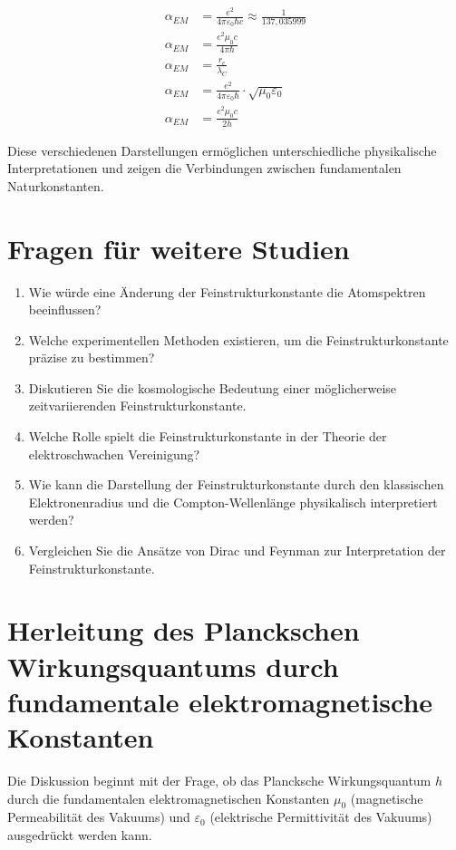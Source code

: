 \documentclass[12pt,a4paper]{article}
\begin{document}
	\begin{align}
		\alpha_{EM} &= \frac{e^2}{4\pi\varepsilon_0\hbar c} \approx \frac{1}{137,035999}\\
		\alpha_{EM} &= \frac{e^2\mu_0 c}{4\pi\hbar}\\
		\alpha_{EM} &= \frac{r_e}{\lambda_C}\\
		\alpha_{EM} &= \frac{e^2}{4\pi\varepsilon_0\hbar} \cdot \sqrt{\mu_0\varepsilon_0}\\
		\alpha_{EM} &= \frac{e^2\mu_0 c}{2h}
	\end{align}
	
	Diese verschiedenen Darstellungen ermöglichen unterschiedliche physikalische Interpretationen und zeigen die Verbindungen zwischen fundamentalen Naturkonstanten.
	
	\section{Fragen für weitere Studien}
	
	\begin{enumerate}
		\item Wie würde eine Änderung der Feinstrukturkonstante die Atomspektren beeinflussen?
		\item Welche experimentellen Methoden existieren, um die Feinstrukturkonstante präzise zu bestimmen?
		\item Diskutieren Sie die kosmologische Bedeutung einer möglicherweise zeitvariierenden Feinstrukturkonstante.
		\item Welche Rolle spielt die Feinstrukturkonstante in der Theorie der elektroschwachen Vereinigung?
		\item Wie kann die Darstellung der Feinstrukturkonstante durch den klassischen Elektronenradius und die Compton-Wellenlänge physikalisch interpretiert werden?
		\item Vergleichen Sie die Ansätze von Dirac und Feynman zur Interpretation der Feinstrukturkonstante.
	\end{enumerate}
	
	\section{Herleitung des Planckschen Wirkungsquantums durch fundamentale elektromagnetische Konstanten}
	
	Die Diskussion beginnt mit der Frage, ob das Plancksche Wirkungsquantum $h$ durch die fundamentalen elektromagnetischen Konstanten $\mu_0$ (magnetische Permeabilität des Vakuums) und $\varepsilon_0$ (elektrische Permittivität des Vakuums) ausgedrückt werden kann.
	
\end{document}
